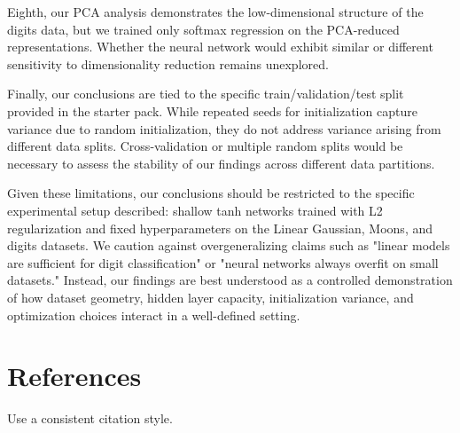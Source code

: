\documentclass[11pt]{article}
\begin{document}
Eighth, our PCA analysis demonstrates the low-dimensional structure of the digits data, but we trained only softmax regression on the PCA-reduced representations. Whether the neural network would exhibit similar or different sensitivity to dimensionality reduction remains unexplored.

Finally, our conclusions are tied to the specific train/validation/test split provided in the starter pack. While repeated seeds for initialization capture variance due to random initialization, they do not address variance arising from different data splits. Cross-validation or multiple random splits would be necessary to assess the stability of our findings across different data partitions.

Given these limitations, our conclusions should be restricted to the specific experimental setup described: shallow tanh networks trained with L2 regularization and fixed hyperparameters on the Linear Gaussian, Moons, and digits datasets. We caution against overgeneralizing claims such as "linear models are sufficient for digit classification" or "neural networks always overfit on small datasets." Instead, our findings are best understood as a controlled demonstration of how dataset geometry, hidden layer capacity, initialization variance, and optimization choices interact in a well-defined setting.


\section*{References}
Use a consistent citation style.
\end{document}
